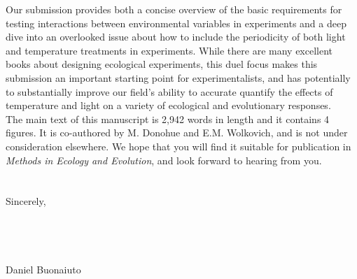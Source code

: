 \documentclass[11.5 pt]{article}
\begin{document}
\noindent Our submission provides both a concise overview of the basic requirements for testing interactions between environmental variables in experiments and a deep dive into an overlooked issue about how to include the periodicity of both light and temperature treatments in experiments. While there are many excellent books about designing ecological experiments, this duel focus makes this submission an important starting point for experimentalists, and has potentially to substantially improve our field's ability to accurate quantify the effects of temperature and light on a variety of ecological and evolutionary responses. \\

\noindent The main text of this manuscript is 2,942 words in length and it contains 4 figures. It is co-authored by M. Donohue and E.M. Wolkovich, and is not under consideration elsewhere. We hope that you will find it suitable for publication in \textit{Methods in Ecology and Evolution}, and look forward to hearing from you.\\\\ 
\\Sincerely,\\\\\\\\\\

\noindent Daniel Buonaiuto\\


\end{document}
